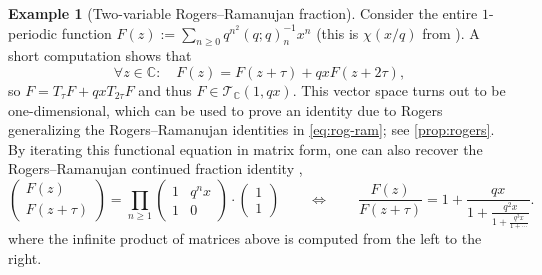 \documentclass[reqno,11pt]{amsart}
\theoremstyle{definition}
\newtheorem{example}[theorem]{Example}
\theoremstyle{remark}
\newtheorem*{remark}{Remark}
\numberwithin{equation}{section}
\newcommand{\C}{\mathbb{C}}
\renewcommand{\H}{{\mathbb{H}}}
\newcommand{\mT}{\mathcal{T}}
\newcommand{\fix}[1]{\textcolor{blue}{\large (#1)\normalsize}}
\begin{document}

\begin{example}[Two-variable Rogers--Ramanujan fraction] \label{ex:two-var-rog-ram}
Consider the entire $1$-periodic function $F(z) := \sum_{n \ge 0} q^{n^2} (q; q)_n^{-1} x^n$ (this is $\chi(x/q)$ from \cite[p.~329]{rogers1893second}). A short computation shows that
\[
    \forall z \in \C : \quad F(z) = F(z+\tau) + qxF(z+2\tau),
\]
so $F = T_\tau F + qxT_{2\tau} F$ and thus $F \in \mT_\C\left(1, qx\right)$. This vector space turns out to be one-dimensional, which can be used to prove an identity due to Rogers generalizing the Rogers--Ramanujan identities in \cref{eq:rog-ram}; see \cref{prop:rogers}. By iterating this functional equation in matrix form, one can also recover the Rogers--Ramanujan continued fraction identity \cite[p.~328 (4)]{rogers1893second},
\[
    \begin{pmatrix}
    F(z)
    \\
    F(z+\tau) 
    \end{pmatrix}
    =
    \prod_{n \ge 1}
    \begin{pmatrix}
    1 & q^n x 
    \\
    1 & 0
    \end{pmatrix}
    \cdot
    \begin{pmatrix}
    1 
    \\
    1
    \end{pmatrix}
    \qquad 
    \Longleftrightarrow 
    \qquad 
    \frac{F(z)}{F(z+\tau)} = 1 + \frac{qx}{1 + \frac{q^2x}{1 + \frac{q^3 x}{1 + \cdots}}}.
\]
where the infinite product of matrices above is computed from the left to the right.
\end{example}
\end{document}
